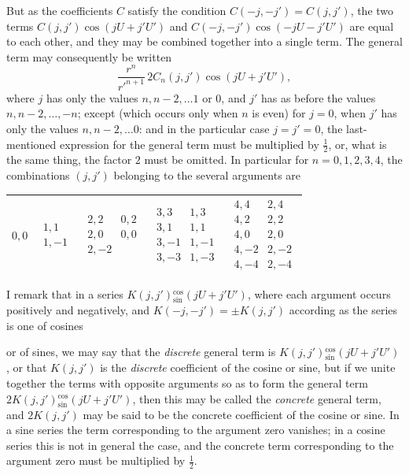 \documentclass[12pt,a4paper]{article}
\theoremstyle{plain}
\begin{document}
\medskip

But as the coefficients $C$ satisfy the condition $C(-j,-j')=C(j,j')$, the two terms $C(j,j')\cos(jU+j'U')$ and $C(-j,-j')\cos(-jU-j'U')$ are equal to each other, and they may be combined together into a single term. The general term may consequently be written
\[
\frac{r^{n}}{r'^{n+1}}\,2C_{n}(j,j')\cos(jU+j'U'),
\]
where $j$ has only the values $n,n-2,\ldots 1$ or $0$, and $j'$ has as before the values $n, n-2,\ldots,-n$; except (which occurs only when $n$ is even) for $j=0$, when $j'$ has only the values $n, n-2,\ldots 0$: and in the particular case $j=j'=0$, the last-mentioned expression for the general term must be multiplied by $\tfrac{1}{2}$, or, what is the same thing, the factor $2$ must be omitted. In particular for $n=0,1,2,3,4$, the combinations $(j,j')$ belonging to the several arguments are

\begin{center}
\small
\setlength{\tabcolsep}{4pt}
\begin{tabular}{|c|c|c|c|c|}
\hline
$0,0$ &
$\begin{array}{c}1,1\\ 1,-1\end{array}$ &
$\begin{array}{cc}2,2 & 0,2\\ 2,0 & 0,0\\ 2,-2 &\end{array}$ &
$\begin{array}{cc}3,3 & 1,3\\ 3,1 & 1,1\\ 3,-1 & 1,-1\\ 3,-3 & 1,-3\end{array}$ &
$\begin{array}{cc}4,4 & 2,4\\ 4,2 & 2,2\\ 4,0 & 2,0\\ 4,-2 & 2,-2\\ 4,-4 & 2,-4\end{array}$ \\
\hline
\end{tabular}
\end{center}

\medskip

I remark that in a series $K(j,j'){}^{\cos}_{\sin}(jU+j'U')$, where each argument occurs positively and negatively, and $K(-j,-j')=\pm K(j,j')$ according as the series is one of cosines

\newpage
{} or of sines, we may say that the \textit{discrete} general term is $K(j,j'){}^{\cos}_{\sin}(jU+j'U')$, or that $K(j,j')$ is the \textit{discrete} coefficient of the cosine or sine, but if we unite together the terms with opposite arguments so as to form the general term $2K(j,j'){}^{\cos}_{\sin}(jU+j'U')$, then this may be called the \textit{concrete} general term, and $2K(j,j')$ may be said to be the concrete coefficient of the cosine or sine. In a sine series the term corresponding to the argument zero vanishes; in a cosine series this is not in general the case, and the concrete term corresponding to the argument zero must be multiplied by $\tfrac{1}{2}$.
\end{document}
